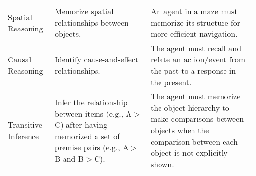 \begin{table*}[t!]
{\begin{tabular}{p{2.1cm}p{7.3cm}p{7cm}}
\\%

Spatial Reasoning
& Memorize spatial relationships between objects.
& An agent in a maze must memorize its structure for more efficient navigation.

\\%

Causal Reasoning
& Identify cause-and-effect relationships.
& The agent must recall and relate an action/event from the past to a response in the present.

\\%

Transitive Inference
& Infer the relationship between items (e.g., A$>$C) after having memorized a set of premise pairs (e.g., A$>$B and B$>$C).
& The agent must memorize the object hierarchy to make comparisons between objects when the comparison between each object is not explicitly shown.

\\%

\bottomrule
\end{tabular}
}
\vspace{-5pt}
\end{table*}
